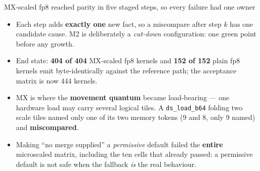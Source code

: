 \documentclass[aspectratio=169,9pt]{beamer}
\newcommand{\key}[1]{\textcolor{acc}{\textbf{#1}}}
\newcommand{\bad}[1]{\textcolor{warn}{\textbf{#1}}}
\newcommand{\good}[1]{\textcolor{ok}{\textbf{#1}}}
\begin{document}
\begin{frame}{MX-scaled fp8 reached parity in five staged steps, so every failure had one owner}
\begin{center}
\end{center}

\begin{itemize}
\item Each step adds \key{exactly one} new fact, so a miscompare after step $k$ has one candidate cause.
      M2 is deliberately a \emph{cut-down} configuration: one green point before any growth.
\item End state: \good{404 of 404} MX-scaled fp8 kernels and \good{152 of 152} plain fp8 kernels
      emit byte-identically against the reference path; the acceptance matrix is now 444 kernels.
\item MX is where the \key{movement quantum} became load-bearing --- one hardware load may carry
      several logical tiles. A \texttt{ds\_load\_b64} folding two scale tiles named only one of its
      two memory tokens (9 and 8, only 9 named) and \bad{miscompared}.
\item Making ``no merge supplied'' a \emph{permissive} default failed the \bad{entire} microscaled
      matrix, including the ten cells that already passed: a permissive default is not safe when the
      fallback \emph{is} the real behaviour.
\end{itemize}
\end{frame}
\end{document}
